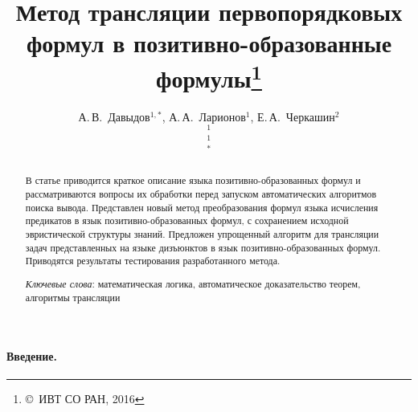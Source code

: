 \documentclass[a4paper]{jctart15b}
\begin{document}
	
\newtheorem{definition}{Определение}
\newtheorem{example}{Пример}

\newcommand{\fictAquantor}{\ensuremath{\forall\colon\varnothing}}
\newcommand{\fictEquantor}{\ensuremath{\exists\colon\varnothing}}
\newcommand{\bomega}{\boldsymbol{\omega}}
\newcommand{\bphi}{\boldsymbol{\phi}}
\newcommand{\eqdef}{\stackrel{\mathrm{df}}{=}}
\newcommand{\bigand}[2]{\raisebox{-2pt}{\ensuremath{\overset{#1}{\underset{#2}{\text{\Large\&\normalfont}}}}}}

\setcounter{page}{1}


\title{Метод трансляции первопорядковых формул в позитивно-образованные формулы\let\thefootnote\relax\footnote{\copyright\ ИВТ СО РАН, 2016}}

\author{
{\sc А.\,В.~Давыдов$^{1,*}$, А.\,А.~Ларионов$^1$, Е.\,А.~Черкашин$^2$}\\
$^1$\\
$^1$\\
$^*$
}

\date{}
\maketitle

\begin{abstract}
    В статье приводится краткое описание языка позитивно-образованных формул и рассматриваются вопросы их обработки перед запуском автоматических алгоритмов поиска вывода. Представлен новый метод преобразования формул языка исчисления предикатов в язык позитивно-образованных формул, с сохранением исходной эвристической структуры знаний. Предложен упрощенный алгоритм для трансляции задач представленных на языке дизъюнктов в язык позитивно-образованных формул. Приводятся результаты тестирования разработанного метода.

    {\it Ключевые слова}: математическая логика, автоматическое доказательство теорем, алгоритмы трансляции
\end{abstract}

\paragraph{Введение.}
\end{document}
